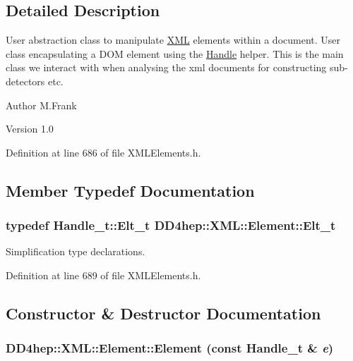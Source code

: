 \subsection{Detailed Description}
User abstraction class to manipulate \hyperlink{namespace_d_d4hep_1_1_x_m_l}{XML} elements within a document. User class encapsulating a DOM element using the \hyperlink{class_d_d4hep_1_1_handle}{Handle} helper. This is the main class we interact with when analysing the xml documents for constructing sub-\/detectors etc.

\begin{DoxyAuthor}{Author}
M.Frank 
\end{DoxyAuthor}
\begin{DoxyVersion}{Version}
1.0 
\end{DoxyVersion}


Definition at line 686 of file XMLElements.h.

\subsection{Member Typedef Documentation}
\hypertarget{class_d_d4hep_1_1_x_m_l_1_1_element_af63782f6873c3d8c9b28e1777cde9275}{
\subsubsection[{Elt\_\-t}]{\setlength{\rightskip}{0pt plus 5cm}typedef {\bf Handle\_\-t::Elt\_\-t} {\bf DD4hep::XML::Element::Elt\_\-t}}}
\label{class_d_d4hep_1_1_x_m_l_1_1_element_af63782f6873c3d8c9b28e1777cde9275}


Simplification type declarations. 

Definition at line 689 of file XMLElements.h.

\subsection{Constructor \& Destructor Documentation}
\hypertarget{class_d_d4hep_1_1_x_m_l_1_1_element_aa30c6619a40cf7e61e6e07d2f21277e5}{
\subsubsection[{Element}]{\setlength{\rightskip}{0pt plus 5cm}DD4hep::XML::Element::Element (const {\bf Handle\_\-t} \& {\em e})}}
\label{class_d_d4hep_1_1_x_m_l_1_1_element_aa30c6619a40cf7e61e6e07d2f21277e5}


